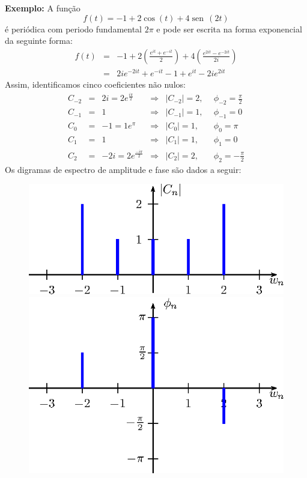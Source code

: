 \documentclass[a4paper,10pt]{book}
\newcommand{\sen}{\operatorname{sen}\,}
\begin{document}
 {\bf Exemplo:} A função 
 \begin{equation}f(t)=-1+2\cos(t)+4\sen(2t)\end{equation}
 é periódica com periodo fundamental $2\pi$ e pode ser escrita na forma exponencial da seguinte forma:
 \begin{eqnarray*}
 f(t)&=&-1+2\left(\frac{e^{it}+e^{-it}}{2}\right)+4\left(\frac{e^{2it}-e^{-2it}}{2i}\right)\\
 &=&2i e^{-2it} + e^{-it}-1+e^{it}- 2ie^{2it}
 \end{eqnarray*}
 Assim, identificamos cinco coeficientes não nulos:
 \begin{equation*}
 \begin{array}{lclcll}
  C_{-2}&=&2i=2e^{\frac{i\pi}{2}} &\Longrightarrow& |C_{-2}|=2, ~~ &\phi_{-2}=\frac{\pi}{2}\\
  C_{-1}&=&1 &\Longrightarrow& |C_{-1}|=1, ~~ &\phi_{-1}=0\\
  C_{0}&=&-1=1e^{\pi} &\Longrightarrow& |C_{0}|=1, ~~ &\phi_0=\pi\\
  C_{1}&=&1 &\Longrightarrow& |C_{1}|=1, ~~ &\phi_1=0\\
  C_{2}&=&-2i=2e^{\frac{-i\pi}{2}} &\Longrightarrow& |C_{2}|=2, ~~ &\phi_2=-\frac{\pi}{2}
 \end{array}
  \end{equation*}
 Os digramas de espectro de amplitude e fase são dados a seguir:
 \begin{figure}[!ht]
 \includegraphics{figs/cap_diagramas_espectro_figura_2}
 \includegraphics{figs/cap_diagramas_espectro_figura_3}
 \end{figure}
\end{document}
